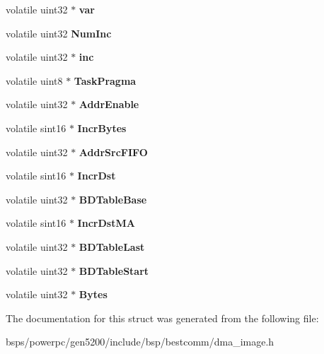 \begin{DoxyCompactItemize}
\mbox{\label{structtask__info3_a793b9acea87e2a9fe01b662c442ac889}} 
volatile uint32 $\ast$ {\bfseries var}
\item 
\mbox{\label{structtask__info3_a318feb7707b1ed1bd4fcc0bb30b1d061}} 
volatile uint32 {\bfseries Num\+Inc}
\item 
\mbox{\label{structtask__info3_a0ec6812502ab2760157a8f1ff20804a6}} 
volatile uint32 $\ast$ {\bfseries inc}
\item 
\mbox{\label{structtask__info3_a62e4526713bdae6888b45fe58df88fc0}} 
volatile uint8 $\ast$ {\bfseries Task\+Pragma}
\item 
\mbox{\label{structtask__info3_af2809c395d9ed097469ebc6776308a8b}} 
volatile uint32 $\ast$ {\bfseries Addr\+Enable}
\item 
\mbox{\label{structtask__info3_aea0ca8b008baf0573df4e7ad319a5e61}} 
volatile sint16 $\ast$ {\bfseries Incr\+Bytes}
\item 
\mbox{\label{structtask__info3_a0dcc37d7e955be2e06876d1a2626142e}} 
volatile uint32 $\ast$ {\bfseries Addr\+Src\+F\+I\+FO}
\item 
\mbox{\label{structtask__info3_aeed7fbdeb0a6ed229ff63422ae1b1ef9}} 
volatile sint16 $\ast$ {\bfseries Incr\+Dst}
\item 
\mbox{\label{structtask__info3_a740559d9a583f846e1a1caec1188845f}} 
volatile uint32 $\ast$ {\bfseries B\+D\+Table\+Base}
\item 
\mbox{\label{structtask__info3_a7af2795045a493b4d5365feb15052886}} 
volatile sint16 $\ast$ {\bfseries Incr\+Dst\+MA}
\item 
\mbox{\label{structtask__info3_a1537405f198a69704fbe988c3b735779}} 
volatile uint32 $\ast$ {\bfseries B\+D\+Table\+Last}
\item 
\mbox{\label{structtask__info3_a1da773692816a9454694edf6caecbaa1}} 
volatile uint32 $\ast$ {\bfseries B\+D\+Table\+Start}
\item 
\mbox{\label{structtask__info3_acfe536a7aea3a3748c082ec05d70eff3}} 
volatile uint32 $\ast$ {\bfseries Bytes}
\end{DoxyCompactItemize}


The documentation for this struct was generated from the following file\+:\begin{DoxyCompactItemize}
\item 
bsps/powerpc/gen5200/include/bsp/bestcomm/dma\+\_\+image.\+h\end{DoxyCompactItemize}
